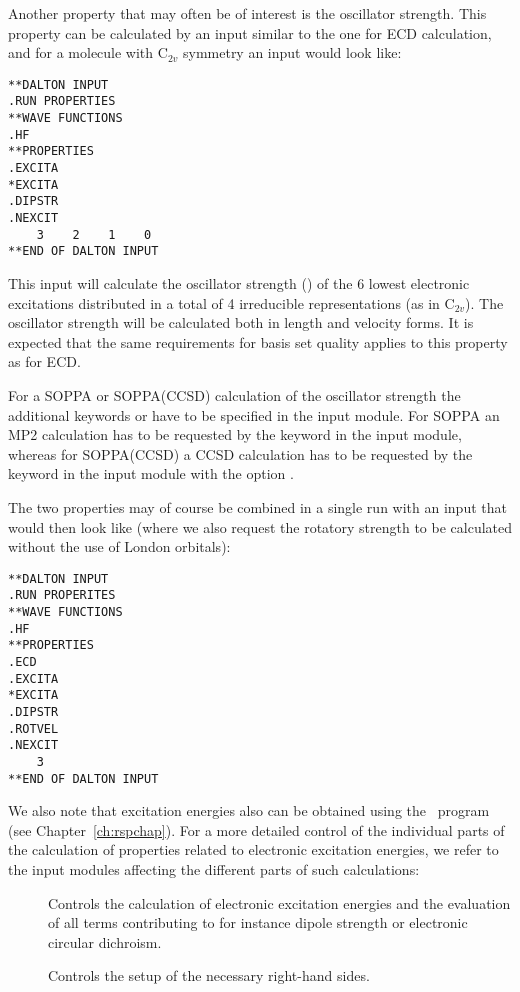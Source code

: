 Another property that may often be of interest is the
oscillator strength. This property can be
calculated by an input 
similar to the one for ECD calculation, and for a molecule with
C$_{2v}$ symmetry an input would look like:

\begin{verbatim}
**DALTON INPUT
.RUN PROPERTIES
**WAVE FUNCTIONS
.HF
**PROPERTIES
.EXCITA
*EXCITA
.DIPSTR
.NEXCIT
    3    2    1    0
**END OF DALTON INPUT
\end{verbatim}

This input will calculate the oscillator strength () of the
6 lowest electronic excitations distributed in a total of 4
irreducible representations (as in C$_{2v}$). The oscillator strength will
be calculated both in 
length and velocity forms. It is expected that the same requirements
for basis set quality applies to this property as for ECD.

For a SOPPA or SOPPA(CCSD) calculation of
the oscillator strength the additional keywords  or
 have to be specified in the  input
module. For SOPPA an MP2 calculation has to be requested by the keyword
 in the  input module, whereas for SOPPA(CCSD) a
CCSD calculation has to be requested by the keyword  in the  input module with the  option
.

The two properties may of course be combined in a single run with an
input that would then look like (where we also request the rotatory
strength to be calculated without the use of London orbitals):

\begin{verbatim}
**DALTON INPUT
.RUN PROPERITES
**WAVE FUNCTIONS
.HF
**PROPERTIES
.ECD
.EXCITA
*EXCITA
.DIPSTR
.ROTVEL
.NEXCIT
    3
**END OF DALTON INPUT
\end{verbatim}

We also note that excitation energies also can be obtained using the
\resp\ program (see Chapter~\ref{ch:rspchap}).
For a more detailed control of the individual parts of the 
calculation of properties related to electronic excitation energies,
we refer to the input modules affecting the different parts of such
calculations:

\begin{description}
\item[] Controls the calculation of electronic excitation
energies and the evaluation of all terms contributing to for instance
dipole strength or electronic circular dichroism.

\item[] Controls the setup of the necessary right-hand
sides.
\end{description}

